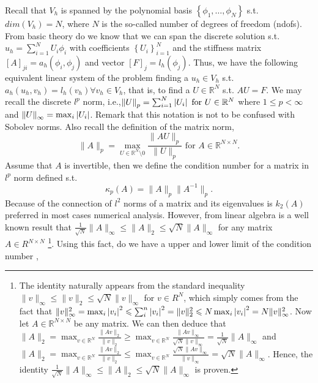 Recall that $V_{h} $ is spanned by the polynomial basis $\left\{ \phi _{1}, \ldots, \phi _{N}  \right\} $ s.t. $dim(V_{h}) = N$, where $N$ is the so-called number of degrees of freedom (ndofs). From basic theory
do we know that we can span the discrete solution s.t.
$u_{h} = \sum_{i=1}^{N}  U_{i} \phi_{i} $ with coefficients $\left\{
U_{i}\right\} _{i=1}^{N}$ and the stiffness matrix $\left[ A  \right] _{ji} = a_{h}( \phi _{i}, \phi _{j}) $ and vector $\left[ F \right] _{j} = l_{h}( \phi_{j} ) $. Thus, we have the following equivalent linear system of the problem finding a $u_{h} \in  V_{h}$ s.t.
$a_{h}( u_{h},v_{h})  = l_{h}( v_{h}) \forall v_{h} \in V_{h}$, that is, to find a $U \in \mathbb{R} ^{N}$ s.t. $AU =F$. We may recall the discrete $l^{p}$ norm, i.e.,\(
    \| U  \|_{ p }^{  } = \sum_{i=1}^{N}  \left\lvert  U_{i}   \right\rvert \text{ for } U \in \mathbb{R} ^{N}
\)
where $1\le p < \infty$ and $\| U \|_{ \infty }^{  }  = \max_{i}  \left\lvert  U_i  \right\rvert $.
Remark that this notation is not to be confused with Sobolev norms.
Also recall the definition of the matrix norm, \[
\| A  \|_{p  }^{  }  = \max_{U \in \mathbb{R} ^{N} \setminus 0} \frac{\| AU \|_{ p }^{  } }{\| U \|_{p}^{  } } \text{ for } A \in \mathbb{R} ^{N\times N}.
\]
Assume that $A $ is invertible, then we define the condition number for a matrix in $l^{p}  $ norm defined s.t. \[
\kappa_{p} ( A) = \| A  \|_{ p }^{  } \| A ^{-1} \|_{ p }  .
\]
Because of the connection of $l^{2}$ norms of a matrix and its eigenvalues is $k_{2}( A) $ preferred in most cases numerical analysis. However, from linear algebra is a well known result that $ \frac{1}{\sqrt{N} }  \| A \|_{ \infty }^{  }  \le \| A \|_{2  }^{  } \le
\sqrt{N}  \| A \|_{\infty  }^{  }  $ for any matrix $A \in R^{N\times N}$  \footnote{
    The identity naturally appears from the standard inequality $\| v \|_{ \infty }^{  } \le  \| v \|_{2  }^{  } \le \sqrt{N}  \| v \|_{ \infty }^{  }   $ for $v \in R^{N}$, which simply comes from the fact that  $ \| v \|_{\infty  }^{ 2 } = \max_{i} \left\lvert  v_{i}  \right\rvert^{2} \leqslant \sum_{i}^{n}   \left\lvert  v_{i}  \right\rvert^{2} = \| v \|_{ 2 }^{2  } \leqslant N      \max_{i} \left\lvert  v_{i}  \right\rvert^{2} = N \| v \|_{
    \infty}^{ 2 }$. Now let $A\in \mathbb{R} ^{N \times N}$ be any matrix. We can then deduce that $ \| A \|_{ 2 }^{  } = \max_{v \in \mathbb{R} ^{N}} \frac{\| Av \|_{2  }^{  }}{\| v \|_{ 2 }^{  } } \ge \max_{v \in \mathbb{R} ^{N}}
    \frac{\| Av \|_{ \infty  }^{  }}{ \sqrt{N} \| v \|_{ \infty}^{  } } = \frac{1}{ \sqrt{N} } \| A \|_{ \infty }^{  }    $ and $ \| A \|_{ 2 }^{  } = \max_{v \in \mathbb{R} ^{N}} \frac{\| Av \|_{2  }^{  }}{\| v \|_{ 2 }^{  } } \le  \max_{v \in \mathbb{R} ^{N}}
    \frac{\sqrt{N} \| Av \|_{ \infty  }^{  }}{  \| v \|_{ \infty}^{  } } =  \sqrt{N} \| A \|_{ \infty }^{  }    $. Hence, the identity $\frac{1}{\sqrt{N} } \| A \|_{\infty  }^{  } \le \| A \|_{ 2 }^{  }\le \sqrt{N} \| A \|_{ \infty  }^{  }   $  is proven.

}. Using this fact, do we have a upper and lower limit of the condition number ,
